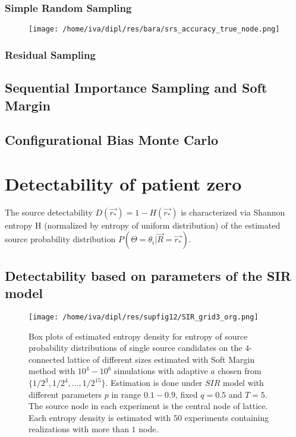\documentclass[times, utf8, diplomski]{fer}
\begin{document}
\subsection{Simple Random Sampling}
\begin{figure}[H]
\texttt{[image: /home/iva/dipl/res/bara/srs\_accuracy\_true\_node.png]}
\caption{}
\label{srs_accuracy_true}
\end{figure}

\subsection{Residual Sampling} %

\section{Sequential Importance Sampling and Soft Margin} %
\section{Configurational Bias Monte Carlo} %

\chapter{Detectability of patient zero} 
\label{Det}

The source detectability $D(\vec{r_*}) = 1 - H(\vec{r_*})$ is characterized via Shannon entropy H (normalized by entropy of uniform distribution) of the estimated source probability distribution $P(\Theta = \theta_i |\vec{R} = \vec{r_*}).$

\section{Detectability based on parameters of the SIR model}
\begin{figure}[H]
\texttt{[image: /home/iva/dipl/res/supfig12/SIR\_grid3\_org.png]}
\caption{Box plots of estimated entropy density for entropy of source probability distributions of 
single source candidates on the $4$-connected lattice of different sizes estimated with Soft Margin method with $10^4 - 10^6$ simulations with adaptive $a$ chosen from $\{1/2^3, 1/2^4, \ldots, 1/2^{15}\}$. Estimation is done under $SIR$ model with different parameters $p$ in range $0.1 - 0.9$, fixed $q = 0.5$ and $T = 5$. The source node in each experiment is the central node of lattice. Each entropy density is estimated with $50$ experiments containing realizations with more than $1$ node.}
\label{network_size}
\end{figure}
\end{document}
